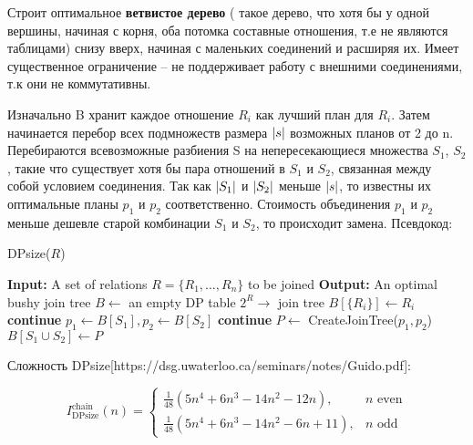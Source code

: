 \documentclass[12pt]{article}
\begin{document}
\begin{flushleft}
Строит оптимальное \textbf{ветвистое дерево} ( такое дерево, что хотя бы у одной вершины,
начиная с корня, оба потомка составные отношения, т.е не являются таблицами)
снизу вверх, начиная с маленьких соединений и расширяя их. Имеет существенное ограничение -- 
не поддерживает работу с внешними соединениями, т.к они не коммутативны.


Изначально B хранит каждое отношение $R_i$ как лучший план для $R_i$. 
Затем начинается перебор всех подмножеств размера $\lvert s\rvert$ возможных 
планов от 2 до n. Перебираются всевозможные разбиения S на непересекающиеся 
множества $S_1$, $S_2$, такие что существует хотя бы пара отношений в $S_1$ 
и $S_2$, связанная между собой условием соединения. Так как $\lvert S_1\rvert$ и 
$\lvert S_2\rvert$ меньше $\lvert s\rvert$, то известны их оптимальные планы $p_1$ и $p_2$ соответственно. 
Стоимость объединения $p_1$ и $p_2$ меньше дешевле старой комбинации $S_1$ и 
$S_2$,  то происходит замена. Псевдокод:

\begin{algorithm}
    \caption{DPsize($R$)}
    \begin{algorithmic}[1]
        \State \textbf{Input:} A set of relations $R = \{R_1, \dots, R_n\}$ to be joined
        \State \textbf{Output:} An optimal bushy join tree
        \State $B \gets$ an empty DP table $2^R \to$ join tree
            \State $B[\{R_i\}] \gets R_i$
        \EndFor
                    \State \textbf{continue}
                \EndIf
                \State $p_1 \gets B[S_1], p_2 \gets B[S_2]$
                 \textbf{continue} \EndIf
                \State $P \gets$ CreateJoinTree($p_1, p_2$)
                    \State $B[S_1 \cup S_2] \gets P$
                \EndIf
            \EndFor
        \EndFor
    \end{algorithmic}
\end{algorithm}

Сложность DPsize[https://dsg.uwaterloo.ca/seminars/notes/Guido.pdf]:

\[
I^{\text{chain}}_{\text{DPsize}}(n) =
\begin{cases}
    \frac{1}{48} (5n^4 + 6n^3 - 14n^2 - 12n), & n \text{ even} \\
    \frac{1}{48} (5n^4 + 6n^3 - 14n^2 - 6n + 11), & n \text{ odd}
\end{cases}
\]


\end{flushleft}
\end{document}
